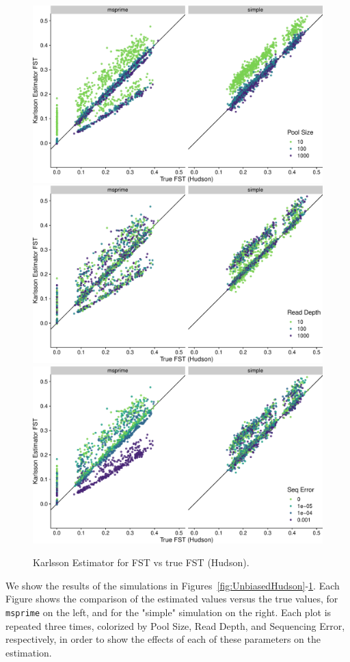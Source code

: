 \documentclass[a4paper,fontsize=9pt,DIV=14]{scrartcl}
\begin{document}
\begin{figure}[p]
    \centering
    \includegraphics[width=.75\linewidth]{true_hudson_fst-est_karlsson-pool_size.pdf}
    \includegraphics[width=.75\linewidth]{true_hudson_fst-est_karlsson-read_depth.pdf}
    \includegraphics[width=.75\linewidth]{true_hudson_fst-est_karlsson-seq_error.pdf}
    \vspace*{-1em}
    \caption{
        Karlsson Estimator for FST vs true FST (Hudson).
    }
\label{fig:Karlsson}
\end{figure}

We show the results of the simulations in Figures~\ref{fig:UnbiasedHudson}-\ref{fig:Karlsson}. Each Figure shows the comparison of the estimated values versus the true values, for \texttt{msprime} on the left, and for the "simple" simulation on the right. Each plot is repeated three times, colorized by Pool Size, Read Depth, and Sequencing Error, respectively, in order to show the effects of each of these parameters on the estimation.
\end{document}

